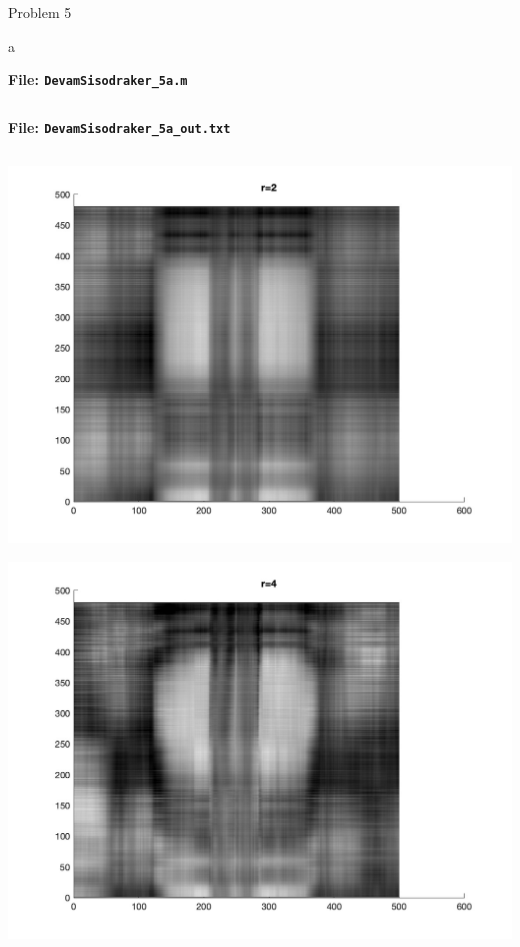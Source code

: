 \begin{section}{Problem 5}
    \newpage

    \begin{solution}{a}
        \begin{mdframed}
            \footnotesize
            \textbf{File: {\tt DevamSisodraker\_5a.m}}
            \inputminted{matlab}{DevamSisodraker_5a.m}
            \normalfont
        \end{mdframed}

        \continued

        \begin{mdframed}
            \footnotesize
            \textbf{File: {\tt DevamSisodraker\_5a\_out.txt}}
            \inputminted{matlab}{DevamSisodraker_5a_out.txt}
            \normalfont
        \end{mdframed}

        \continued

        \begin{mdframed}
            \includegraphics[scale=0.33]{DevamSisodraker_5a_2.jpg}
        \end{mdframed}

        \continued

        \begin{mdframed}
            \includegraphics[scale=0.33]{DevamSisodraker_5a_4.jpg}
        \end{mdframed}


\end{solution}
\end{section}
